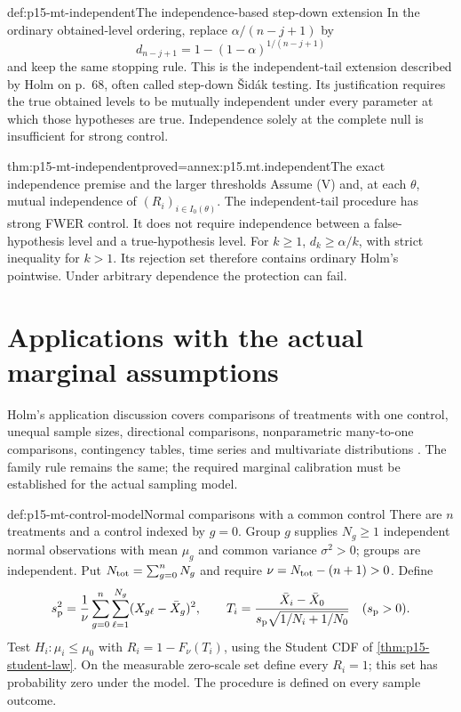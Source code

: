 \begin{hbmethod}{def:p15-mt-independent}{The independence-based step-down extension}
In the ordinary obtained-level ordering, replace \(\alpha/(n-j+1)\) by
\[
                  d_{n-j+1}=1-(1-\alpha)^{1/(n-j+1)}
\]
and keep the same stopping rule.
This is the independent-tail extension described by Holm on p.~68,
often called step-down \v{S}id\'ak testing.
Its justification requires the true obtained levels to be mutually
independent under every parameter at which those hypotheses are true.
Independence solely at the complete null is insufficient for strong control.
\end{hbmethod}

\begin{hbtheorem}{thm:p15-mt-independent}{proved=annex:p15.mt.independent}{The exact independence premise and the larger thresholds}
Assume (V) and, at each \(\theta\), mutual independence of
\((R_i)_{i\in I_0(\theta)}\). The independent-tail procedure has strong
FWER control. It does not require independence between a false-hypothesis
level and a true-hypothesis level.
For \(k\geq1\), \(d_k\geq\alpha/k\), with strict inequality for \(k>1\).
Its rejection set therefore contains ordinary Holm's pointwise.
Under arbitrary dependence the protection can fail.
\end{hbtheorem}

\section{Applications with the actual marginal assumptions}
\label{sec:p15-mt-applications}

Holm's application discussion covers comparisons of treatments with one
control, unequal sample sizes, directional comparisons, nonparametric
many-to-one comparisons, contingency tables, time series and multivariate
distributions \cite[pp.~68--70]{Holm1979Original}.
The family rule remains the same; the required marginal calibration
must be established for the actual sampling model.

\begin{hbdefinition}{def:p15-mt-control-model}{Normal comparisons with a common control}
There are \(n\) treatments and a control indexed by \(g=0\).
Group \(g\) supplies \(N_g\geq1\) independent normal observations
with mean \(\mu_g\) and common variance \(\sigma^2>0\); groups are independent.
Put \(N_{\rm tot}=\sum_{g=0}^nN_g\) and require
\(\nu=N_{\rm tot}-(n+1)>0\). Define
\[
 s_{\rm p}^2=\frac1\nu\sum_{g=0}^n\sum_{\ell=1}^{N_g}
                     (X_{g\ell}-\bar X_g)^2,\qquad
 T_i=\frac{\bar X_i-\bar X_0}
                   {s_{\rm p}\sqrt{1/N_i+1/N_0}}\quad(s_{\rm p}>0).
\]
Test \(H_i:\mu_i\leq\mu_0\) with \(R_i=1-F_\nu(T_i)\), using the
Student CDF of \cref{thm:p15-student-law}. On the measurable zero-scale
set define every \(R_i=1\); this set has probability zero under the model.
The procedure is defined on every sample outcome.
\end{hbdefinition}

